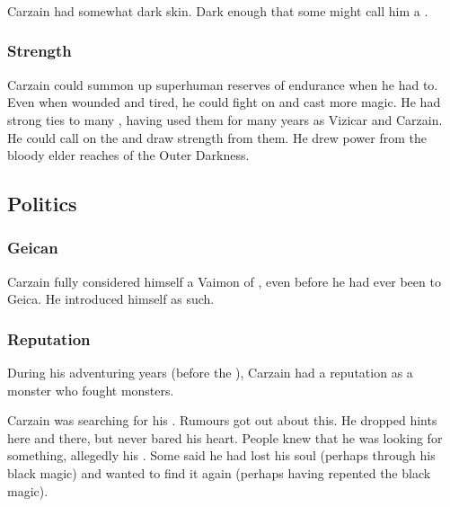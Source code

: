 \subsubsection{\Demihuman}
Carzain had somewhat dark skin. 
Dark enough that some might call him a \demihuman.





\subsubsection{Strength}
Carzain could summon up superhuman reserves of endurance when he had to. 
Even when wounded and tired, he could fight on and cast more magic. 
He had strong ties to many \qliphoth, having used them for many years as Vizicar and Carzain. 
He could call on the \qliphoth and draw strength from them. 
He drew power from the bloody elder reaches of the Outer Darkness. 









\subsection{Politics}





\subsubsection{Geican}
Carzain fully considered himself a Vaimon of \ClanGeican, even before he had ever been to Geica.
He introduced himself as such. 





\subsubsection{Reputation}
During his adventuring years (before the ), Carzain had a reputation as a monster who fought monsters. 

Carzain was searching for his .
Rumours got out about this. 
He dropped hints here and there, but never bared his heart. 
People knew that he was looking for something, allegedly his . 
Some said he had lost his soul (perhaps through his black magic) and wanted to find it again (perhaps having repented the black magic). 









